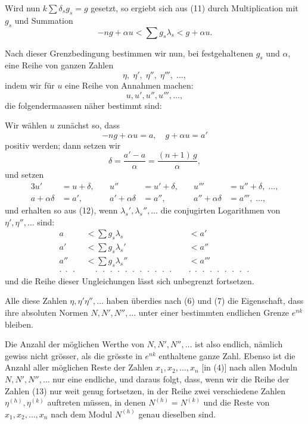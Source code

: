 \documentclass[12pt,a4paper]{article}
\begin{document}
Wird nun $k\sum\delta_s g_s = g$ gesetzt, so ergiebt sich aus (11) durch Multiplication mit $g_s$ und Summation
\begin{equation}\label{eq:185-12}
-ng + \alpha u < \sum g_s\lambda_s < g + \alpha u.
\end{equation}

Nach dieser Grenzbedingung bestimmen wir nun, bei festgehaltenen $g_s$ und $\alpha$, eine Reihe von ganzen Zahlen
\begin{equation}\label{eq:185-13}
\eta,\; \eta',\; \eta'',\; \eta''',\; \ldots,
\end{equation}
indem wir für $u$ eine Reihe von Annahmen machen:
\[
u, u', u'', u''', \ldots,
\]
die folgendermaassen näher bestimmt sind:

Wir wählen $u$ zunächst so, dass
\[
-ng + \alpha u = a,\quad g + \alpha u = a'
\]
positiv werden; dann setzen wir
\[
\delta = \frac{a' - a}{\alpha} = \frac{(n+1)\,g}{\alpha},
\]
und setzen
\begin{alignat*}{3}
u' &= u + \delta, &\quad u'' &= u' + \delta, &\quad u''' &= u'' + \delta,\; \ldots,\\
a + \alpha\delta &= a', &\quad a' + \alpha\delta &= a'', &\quad a'' + \alpha\delta &= a''',\; \ldots,
\end{alignat*}
und erhalten so aus (12), wenn $\lambda_s', \lambda_s'', \ldots$ die conjugirten Logarithmen von $\eta', \eta'', \ldots$ sind:
\begin{equation}\label{eq:185-14}
\begin{aligned}
a &< \sum g_s\lambda_s &&< a'\\
a' &< \sum g_s\lambda_s' &&< a''\\
a'' &< \sum g_s\lambda_s'' &&< a'''\\
\cdot\;\cdot\;\cdot\; &\quad\cdot\;\cdot\;\cdot\;\cdot\;\cdot\;\cdot\;\cdot\;\cdot\;\cdot\;\cdot\;\cdot\; &&\cdot\;\cdot\;\cdot\;\cdot\;\cdot\;\cdot\;\cdot\;\cdot\;\cdot
\end{aligned}
\end{equation}
und die Reihe dieser Ungleichungen lässt sich unbegrenzt fortsetzen.

Alle diese Zahlen $\eta, \eta'\eta'', \ldots$ haben überdies nach (6) und (7) die Eigenschaft, dass ihre absoluten Normen $N, N', N'', \ldots$ unter einer bestimmten endlichen Grenze $e^{nk}$ bleiben.

Die Anzahl der möglichen Werthe von $N, N', N'', \ldots$ ist also endlich, nämlich gewiss nicht grösser, als die grösste in $e^{nk}$ enthaltene ganze Zahl. Ebenso ist die Anzahl aller möglichen Reste der Zahlen $x_1, x_2, \ldots, x_n$ [in (4)] nach allen Moduln $N, N', N'', \ldots$ nur eine endliche, und daraus folgt, dass, wenn wir die Reihe der Zahlen (13) nur weit genug fortsetzen, in der Reihe zwei verschiedene Zahlen $\eta^{(h)}, \eta^{(k)}$ auftreten müssen, in denen $N^{(h)} = N^{(k)}$ und die Reste von $x_1, x_2, \ldots, x_n$ nach dem Modul $N^{(h)}$ genau dieselben sind.
\end{document}
